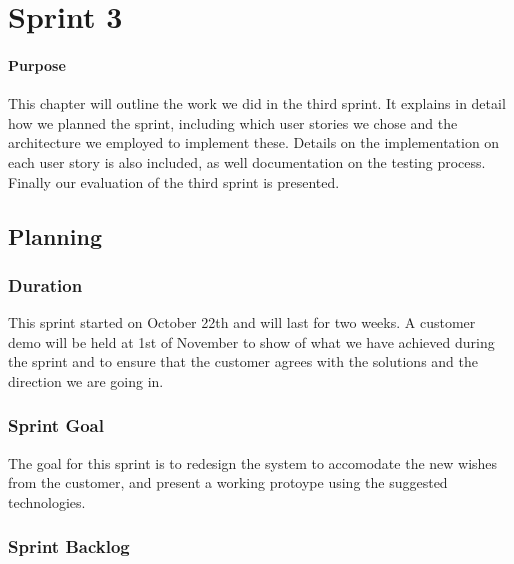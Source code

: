 \chapter{Sprint 3}

\minitoc

\subsubsection{Purpose}

This chapter will outline the work we did in the third sprint. It explains in detail how we planned the sprint, including which user stories we chose and the architecture we employed to implement these. Details on the implementation on each user story is also included, as well documentation on the testing process. Finally our evaluation of the third sprint is presented. 

\clearpage

\section{Planning}

\subsection{Duration}
This sprint started on October 22th and will last for two weeks. A customer demo will be held at 1st of November to show of what we have achieved during the sprint and to ensure that the customer agrees with the solutions and the direction we are going in.

\subsection{Sprint Goal}
The goal for this sprint is to redesign the system to accomodate the new wishes from the customer, and present a working protoype using the suggested technologies.

\subsection{Sprint Backlog}

